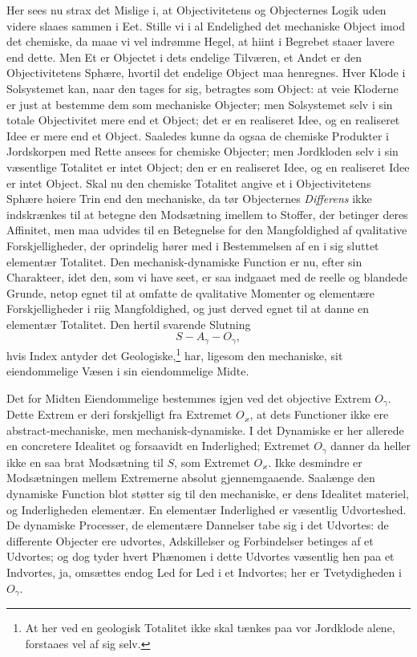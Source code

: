 \documentclass[12pt]{book}
\newcommand{\opage}[1]{\marginnote{\footnotesize\textit{[#1]}}}
\begin{document}
Her sees nu strax det Mislige i, at Objectivitetens og Objecternes Logik uden videre slaaes sammen i
Eet. Stille vi i al Endelighed det mechaniske Object imod det chemiske, da maae vi vel indrømme Hegel,
at hiint i Begrebet staaer lavere end dette. Men Et er Objectet i dets endelige Tilværen, et Andet er
den Objectivitetens Sphære, hvortil det endelige Object maa henregnes. Hver Klode i Solsystemet kan,
naar den tages for sig, betragtes som Object: at veie Kloderne er just at bestemme dem som mechaniske
Objecter; men Solsystemet selv i sin totale Objectivitet mere end et Object; det er en realiseret
Idee, og en realiseret Idee er mere end et Object. Saaledes kunne da ogsaa de chemiske Produkter i
Jordskorpen med Rette ansees for chemiske Objecter; men Jordkloden selv i sin væsentlige Totalitet er
intet Object; den er en realiseret Idee, og en realiseret Idee er intet Object. Skal nu den chemiske
Totalitet angive et i Objectivitetens Sphære høiere Trin end den mechaniske, da tør Objecternes
\emph{Differens} ikke indskrænkes til at betegne den Modsætning imellem to Stoffer, der betinger deres
Affinitet, men maa udvides til en Betegnelse for den Mangfoldighed af qvalitative Forskjelligheder,
der oprindelig hører med i Bestemmelsen af en i sig sluttet elementær Totalitet. Den
mechanisk-dynamiske Function er nu, efter sin Charakteer, idet den, som vi have seet, er saa indgaaet
med de reelle og blandede Grunde, netop egnet til at omfatte de qvalitative Momenter og elementære
Forskjelligheder i riig Mangfoldighed, og just derved egnet til at danne en elementær Totalitet. Den
hertil svarende Slutning
\[ S - A_\gamma - O_\gamma, \]
\opage{440} hvis Index antyder det Geologiske,\footnote{At her ved en geologisk Totalitet ikke skal tænkes paa vor
Jordklode alene, forstaaes vel af sig selv.} har, ligesom den mechaniske, sit eiendommelige Væsen i
sin eiendommelige Midte.

Det for Midten Eiendommelige bestemmes igjen ved det objective Extrem $O_\gamma$. Dette Extrem er deri
forskjelligt fra Extremet $O_{\varkappa}$, at dets Functioner ikke ere abstract-mechaniske, men
mechanisk-dynamiske. I det Dynamiske er her allerede en concretere Idealitet og forsaavidt en
Inderlighed; Extremet $O_\gamma$ danner da heller ikke en saa brat Modsætning til $S$, som Extremet
$O_{\varkappa}$. Ikke desmindre er Modsætningen mellem Extremerne absolut gjennemgaaende. Saalænge den
dynamiske Function blot støtter sig til den mechaniske, er dens Idealitet materiel, og Inderligheden
elementær. En elementær Inderlighed er væsentlig Udvorteshed. De dynamiske Processer, de elementære
Dannelser tabe sig i det Udvortes: de differente Objecter ere udvortes, Adskillelser og Forbindelser
betinges af et Udvortes; og dog tyder hvert Phænomen i dette Udvortes væsentlig hen paa et Indvortes,
ja, omsættes endog Led for Led i et Indvortes; her er Tvetydigheden i $O_\gamma$.
\end{document}
